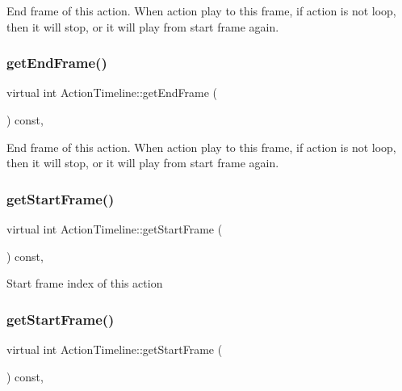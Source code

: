 End frame of this action. When action play to this frame, if action is not loop, then it will stop, or it will play from start frame again. \mbox{\label{classActionTimeline_a1bdee13b0de8081126528d2f7f4e1479}} 
\subsubsection{\texorpdfstring{get\+End\+Frame()}{getEndFrame()}\hspace{0.1cm}{\footnotesize\ttfamily [2/2]}}
{\footnotesize\ttfamily virtual int Action\+Timeline\+::get\+End\+Frame (\begin{DoxyParamCaption}{ }\end{DoxyParamCaption}) const\hspace{0.3cm}{\ttfamily [inline]}, {\ttfamily [virtual]}}

End frame of this action. When action play to this frame, if action is not loop, then it will stop, or it will play from start frame again. \mbox{\label{classActionTimeline_a5697337196c4138ac004d88f88e38f5e}} 
\subsubsection{\texorpdfstring{get\+Start\+Frame()}{getStartFrame()}\hspace{0.1cm}{\footnotesize\ttfamily [1/2]}}
{\footnotesize\ttfamily virtual int Action\+Timeline\+::get\+Start\+Frame (\begin{DoxyParamCaption}{ }\end{DoxyParamCaption}) const\hspace{0.3cm}{\ttfamily [inline]}, {\ttfamily [virtual]}}

Start frame index of this action \mbox{\label{classActionTimeline_a5697337196c4138ac004d88f88e38f5e}} 
\subsubsection{\texorpdfstring{get\+Start\+Frame()}{getStartFrame()}\hspace{0.1cm}{\footnotesize\ttfamily [2/2]}}
{\footnotesize\ttfamily virtual int Action\+Timeline\+::get\+Start\+Frame (\begin{DoxyParamCaption}{ }\end{DoxyParamCaption}) const\hspace{0.3cm}{\ttfamily [inline]}, {\ttfamily [virtual]}}


